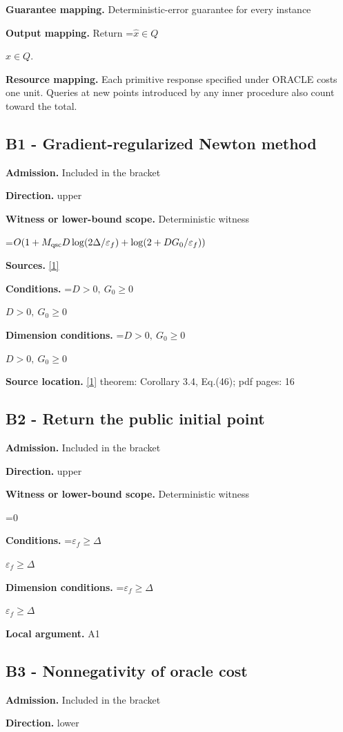 \documentclass[10pt,a4paper]{article}
\newcommand{\AtlasMath}[1]{\par\begingroup\centering\setbox0=\hbox{$\displaystyle #1$}\ifdim\wd0>1.4\linewidth\typeout{ATLAS WIDE FORMULA: \the\wd0}\fi\ifdim\wd0>\linewidth\resizebox{\linewidth}{!}{\box0}\else\box0\fi\par\endgroup}
\newcommand{\AtlasInlineMath}[1]{\begingroup\setbox0=\hbox{$#1$}\ifdim\wd0>.4\linewidth\endgroup\AtlasMath{#1}\else\endgroup$#1$\fi}
\begin{document}
\textbf{Guarantee mapping.} Deterministic-error guarantee for every instance

\textbf{Output mapping.} Return \AtlasInlineMath{\widehat{x}\in Q}.

\textbf{Resource mapping.} Each primitive response specified under ORACLE costs one unit. Queries at new points introduced by any inner procedure also count toward the total.

\subsection{B1 - Gradient-regularized Newton method}
\textbf{Admission.} Included in the bracket

\textbf{Direction.} upper

\textbf{Witness or lower-bound scope.} Deterministic witness

\AtlasMath{O(1+M_{\rm qsc}D\log(2\Delta/\varepsilon_f)+\log(2+DG_0/\varepsilon_f))}
\textbf{Sources.} \href{https://arxiv.org/pdf/2308.14742v1}{[1]}

\textbf{Conditions.} \AtlasInlineMath{D>0,\ G_0\ge0}

\textbf{Dimension conditions.} \AtlasInlineMath{D>0,\ G_0\ge0}

\textbf{Source location.} \href{https://arxiv.org/pdf/2308.14742v1}{[1]} theorem: Corollary 3.4, Eq.(46); pdf pages: 16

\subsection{B2 - Return the public initial point}
\textbf{Admission.} Included in the bracket

\textbf{Direction.} upper

\textbf{Witness or lower-bound scope.} Deterministic witness

\AtlasMath{0}
\textbf{Conditions.} \AtlasInlineMath{\varepsilon_f\ge\Delta}

\textbf{Dimension conditions.} \AtlasInlineMath{\varepsilon_f\ge\Delta}

\textbf{Local argument.} A1

\subsection{B3 - Nonnegativity of oracle cost}
\textbf{Admission.} Included in the bracket

\textbf{Direction.} lower
\end{document}
